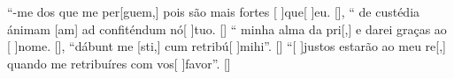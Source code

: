 {    {``-me dos que me per[guem,] pois são mais fortes [ ]{que}[ ]{eu}. [\LinkPT]},
  {`` de custédia ánimam [am] ad confitén\-dum nó[ ]{tu}o. [\LinkLA]}%
    {`` minha alma da pri[,] e darei graças ao [ ]{no}me. [\LinkPT]},
  {``dábunt me [sti,] cum retribú[ ]{mi}hi''.
      [\LinkLA]}%
    {``[ ]{jus}tos estarão ao meu re[,] quando me retribuíres com vos[ ]{fa}{vor}''. [\LinkPT]}
}